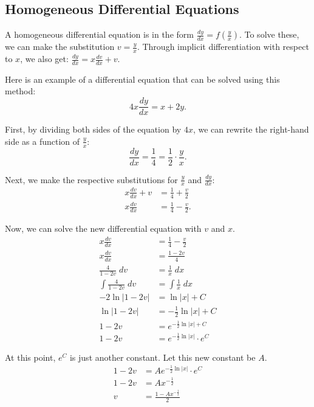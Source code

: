 \subsection{Homogeneous Differential Equations}
A homogeneous differential equation is in the form $\frac{dy}{dx} = f \left( \frac{y}{x} \right)$. To solve these, we can make the substitution $v = \frac{y}{x}$. Through implicit differentiation with respect to $x$, we also get: $\frac{dy}{dx} = x \frac{dv}{dx} + v$.

\noindent Here is an example of a differential equation that can be solved using this method:
\[ 4x \frac{dy}{dx} = x + 2y. \]

\noindent First, by dividing both sides of the equation by $4x$, we can rewrite the right-hand side as a function of $\frac{y}{x}$:
\[ \frac{dy}{dx} = \frac{1}{4} = \frac{1}{2} \cdot \frac{y}{x}. \]

\noindent Next, we make the respective substitutions for $\frac{y}{x}$ and $\frac{dy}{dx}$:
\begin{align*}
	x \frac{dv}{dx} + v &= \frac{1}{4} + \frac{v}{2} \\[5pt]
	x \frac{dv}{dx} &= \frac{1}{4} - \frac{v}{2}.
\end{align*}

\noindent Now, we can solve the new differential equation with $v$ and $x$.
\begin{align*}
	x \frac{dv}{dx} &= \frac{1}{4} - \frac{v}{2} \\[5pt]
	x \frac{dv}{dx} &= \frac{1 - 2v}{4} \\[5pt]
	\frac{4}{1 - 2v} \; dv &= \frac{1}{x} \; dx \\[5pt]
	\int \frac{4}{1 - 2v} \; dv &= \int \frac{1}{x} \; dx \\[5pt]
	-2 \ln |1 - 2v| &= \ln |x| + C \\
	\ln |1 - 2v| &= -\frac{1}{2} \ln |x| + C \\[5pt]
	1 - 2v &= e^{-\frac{1}{2} \ln |x| + C} \\
	1 - 2v &= e^{-\frac{1}{2} \ln |x|} \cdot e^C
\end{align*}

\noindent At this point, $e^C$ is just another constant. Let this new constant be $A$.
\begin{align*}
	1 - 2v &= A e^{-\frac{1}{2} \ln |x|} \cdot e^C \\
	1 - 2v  &= A x^{-\frac{1}{2}} \\
	v &= \frac{1 - A x^{-\frac{1}{2}}}{2}
\end{align*}

